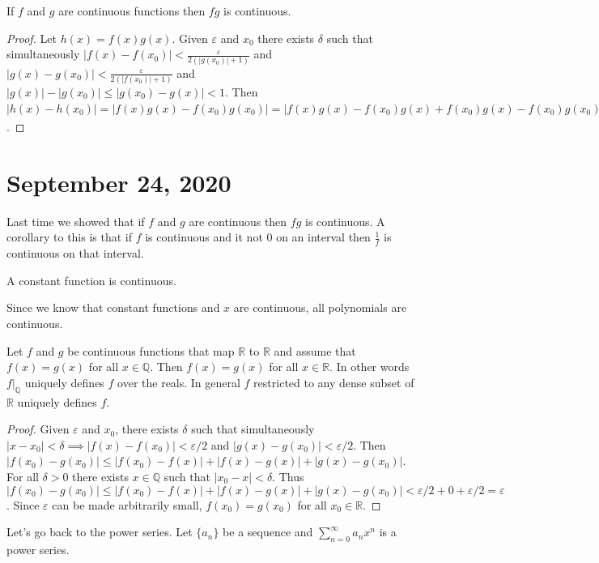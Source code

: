 \documentclass{article}
\newcommand{\Q}{\mathbb{Q}}
\newcommand{\R}{\mathbb{R}}
\newcommand{\eps}{\varepsilon}
\begin{document}
\begin{proposition}
If $f$ and $g$ are continuous functions then $fg$ is continuous.
\end{proposition}
\begin{proof}
Let $h(x)=f(x)g(x)$. Given $\eps$ and $x_0$ there exists $\delta$ such that simultaneously $|f(x)-f(x_0)|<\frac{\eps}{2(|g(x_0)|+1)}$ and $|g(x)-g(x_0)|<\frac{\eps}{2(|f(x_0)|+1)}$ and $|g(x)|-|g(x_0)|\leq|g(x_0)-g(x)|<1$. Then $|h(x)-h(x_0)|=|f(x)g(x)-f(x_0)g(x_0)|=|f(x)g(x)-f(x_0)g(x)+f(x_0)g(x)-f(x_0)g(x_0)|\leq|g(x)||f(x)-f(x_0)|+|f(x_0)||g(x)-g(x_0)|<(|g(x_0)|+1)|f(x)-f(x_0)|+|f(x_0)||g(x)-g(x_0)|<\frac{\eps}{2}+\frac{\eps|f(x_0)|}{2(|f(x_0)|+1)}<\eps$.
\end{proof}
\section{September 24, 2020}
Last time we showed that if $f$ and $g$ are continuous then $fg$ is continuous. A corollary to this is that if $f$ is continuous and it not 0 on an interval then $\frac{1}{f}$ is continuous on that interval.
\begin{example}
A constant function is continuous.
\end{example}
\begin{example}
Since we know that constant functions and $x$ are continuous, all polynomials are continuous.
\end{example}
\begin{theorem}
Let $f$ and $g$ be continuous functions that map $\R$ to $\R$ and assume that $f(x)=g(x)$ for all $x\in \Q$. Then $f(x)=g(x)$ for all $x\in \R$. In other words $f|_\Q$ uniquely defines $f$ over the reals. In general $f$ restricted to any dense subset of $\R$ uniquely defines $f$.
\end{theorem}
\begin{proof}
Given $\eps$ and $x_0$, there exists $\delta$ such that simultaneously $|x-x_0|<\delta\implies |f(x)-f(x_0)|<\eps/2$ and $|g(x)-g(x_0)|<\eps/2$. Then $|f(x_0)-g(x_0)|\leq|f(x_0)-f(x)|+|f(x)-g(x)|+|g(x)-g(x_0)|$. For all $\delta>0$ there exists $x\in \Q$ such that $|x_0-x|<\delta$. Thus $|f(x_0)-g(x_0)|\leq|f(x_0)-f(x)|+|f(x)-g(x)|+|g(x)-g(x_0)|< \eps/2+0+\eps/2=\eps$. Since $\eps$ can be made arbitrarily small, $f(x_0)=g(x_0)$ for all $x_0\in \R$.
\end{proof}
\begin{definition}
Let's go back to the power series. Let $\{a_n\}$ be a sequence and $\sum_{n=0}^\infty a_n x^n$ is a power series.
\end{definition}
\end{document}
